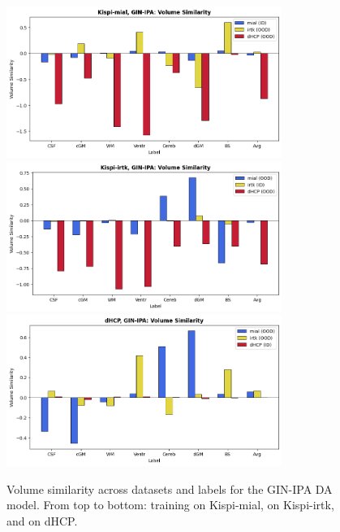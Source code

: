 \begin{figure}[htbp]
    \centering
    \includegraphics[width=0.8\textwidth]{figures/mial_ginipa_VS.png}\\
    \vspace{10pt}
    \includegraphics[width=0.8\textwidth]{figures/irtk_ginipa_VS.png}\\
    \vspace{10pt}
    \includegraphics[width=0.8\textwidth]{figures/dHCP_ginipa_VS.png}
    \caption{Volume similarity across datasets and labels for the GIN-IPA DA model. From top to bottom: training on Kispi-mial, on Kispi-irtk, and on dHCP.}
    \label{fig:ginipa_VS}
\end{figure}

